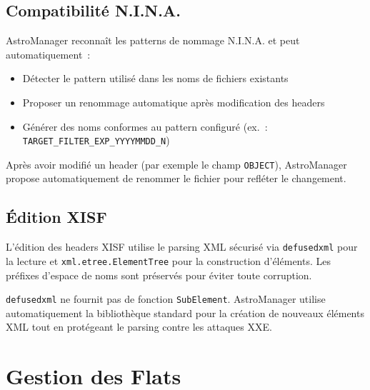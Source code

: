 \documentclass[a4paper,11pt]{article}
\begin{document}
\subsection{Compatibilit\'{e} N.I.N.A.}

AstroManager reconna\^{i}t les patterns de nommage N.I.N.A. et peut automatiquement~:

\begin{itemize}
    \item D\'{e}tecter le pattern utilis\'{e} dans les noms de fichiers existants
    \item Proposer un renommage automatique apr\`{e}s modification des headers
    \item G\'{e}n\'{e}rer des noms conformes au pattern configur\'{e} (ex.~: \texttt{TARGET\_FILTER\_EXP\_YYYYMMDD\_N})
\end{itemize}

\begin{tipbox}
Apr\`{e}s avoir modifi\'{e} un header (par exemple le champ \texttt{OBJECT}), AstroManager propose automatiquement de renommer le fichier pour refl\'{e}ter le changement.
\end{tipbox}

\subsection{\'{E}dition XISF}

L'\'{e}dition des headers XISF utilise le parsing XML s\'{e}curis\'{e} via \texttt{defusedxml} pour la lecture et \texttt{xml.etree.ElementTree} pour la construction d'\'{e}l\'{e}ments. Les pr\'{e}fixes d'espace de noms sont pr\'{e}serv\'{e}s pour \'{e}viter toute corruption.

\begin{warningbox}
\texttt{defusedxml} ne fournit pas de fonction \texttt{SubElement}. AstroManager utilise automatiquement la biblioth\`{e}que standard pour la cr\'{e}ation de nouveaux \'{e}l\'{e}ments XML tout en prot\'{e}geant le parsing contre les attaques XXE.
\end{warningbox}


\section{Gestion des Flats}
\label{sec:flats}
\end{document}
